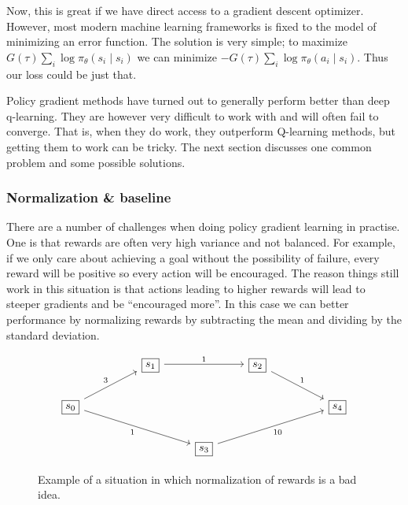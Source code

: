 \documentclass{article}
\theoremstyle{changedot}
\theoremstyle{changedotbreak}
\theoremstyle{nonumberplain}
\begin{document}
Now, this is great if we have direct access to a gradient descent optimizer. However, most modern machine learning frameworks is fixed to the model of minimizing an error function. The solution is very simple; to maximize $G(\tau) \sum_{i} \log \pi_{\theta} (s_{i} \mid s_{i})$ we can minimize $-G(\tau) \sum_{i} \log \pi_{\theta} (a_{i} \mid s_{i})$. Thus our loss could be just that.%

Policy gradient methods have turned out to generally perform better than deep q-learning. They are however very difficult to work with and will often fail to converge. That is, when they do work, they outperform Q-learning methods, but getting them to work can be tricky. The next section discusses one common problem and some possible solutions.

\subsubsection{Normalization \& baseline}
There are a number of challenges when doing policy gradient learning in practise. One is that rewards are often very high variance and not balanced. For example, if we only care about achieving a goal without the possibility of failure, every reward will be positive so every action will be encouraged. The reason things still work in this situation is that actions leading to higher rewards will lead to steeper gradients and be ``encouraged more''. In this case we can better performance by normalizing rewards by subtracting the mean and dividing by the standard deviation.

\begin{figure} 
\[\begin{tikzcd}
	&& {\boxed{s_1}} && {\boxed{s_2}} \\
	{\boxed{s_0}} &&&&&& {\boxed{s_4}} \\
	&&& {\boxed{s_3}}
	\arrow["3", from=2-1, to=1-3]
	\arrow["1"', from=2-1, to=3-4]
	\arrow["1", from=1-3, to=1-5]
	\arrow["1", from=1-5, to=2-7]
	\arrow["10"', from=3-4, to=2-7]
\end{tikzcd}\]
\caption{Example of a situation in which normalization of rewards is a bad idea.}
\label{fig:bad_norm}
\end{figure}
\end{document}
